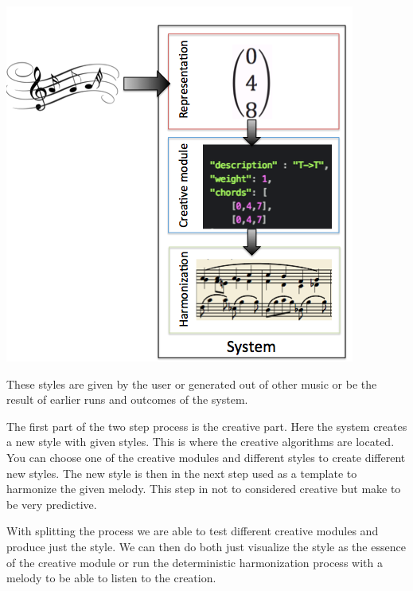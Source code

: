 \includegraphics[scale=1]{Chapters/pic/sys_arch.png}

These styles are given by the user or generated out of other music or be the result of earlier runs and outcomes of the system.

The first part of the two step process is the creative part. Here the system creates a new style with given styles. This is where the creative algorithms are located. You can choose one of the creative modules and different styles to create different new styles. The new style is then in the next step used as a template to harmonize the given melody. This step in not to considered creative but make to be very predictive.

With splitting the process we are able to test different creative modules and produce just the style. We can then do both just visualize the style as the essence of the creative module or run the deterministic harmonization process with a melody to be able to listen to the creation. 